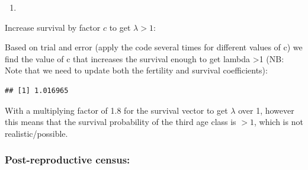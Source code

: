 \documentclass[
]{book}
\newenvironment{Shaded}{\begin{snugshade}}{\end{snugshade}}
\newcommand{\AttributeTok}[1]{\textcolor[rgb]{0.77,0.63,0.00}{#1}}
\newcommand{\CommentTok}[1]{\textcolor[rgb]{0.56,0.35,0.01}{\textit{#1}}}
\newcommand{\DecValTok}[1]{\textcolor[rgb]{0.00,0.00,0.81}{#1}}
\newcommand{\FloatTok}[1]{\textcolor[rgb]{0.00,0.00,0.81}{#1}}
\newcommand{\FunctionTok}[1]{\textcolor[rgb]{0.00,0.00,0.00}{#1}}
\newcommand{\NormalTok}[1]{#1}
\newcommand{\OtherTok}[1]{\textcolor[rgb]{0.56,0.35,0.01}{#1}}
\newcommand{\SpecialCharTok}[1]{\textcolor[rgb]{0.00,0.00,0.00}{#1}}
\providecommand{\tightlist}{%
  \setlength{\itemsep}{0pt}\setlength{\parskip}{0pt}}
\begin{document}
\begin{enumerate}
\def\labelenumi{\arabic{enumi}.}
\setcounter{enumi}{7}
\tightlist
\item
\end{enumerate}

Increase survival by factor \(c\) to get \(\lambda>1\):

Based on trial and error (apply the code several times for different values of c) we find the value of c that increases the survival enough to get lambda \textgreater1 (NB: Note that we need to update both the fertility and survival coefficients):

\begin{Shaded}
\end{Shaded}

\begin{verbatim}
## [1] 1.016965
\end{verbatim}

With a multiplying factor of 1.8 for the survival vector to get \(\lambda\) over 1, however this means that the survival probability of the third age class is \(>1\), which is not realistic/possible.

\hypertarget{post-reproductive-census-1}{%
\subsubsection*{Post-reproductive census:}\label{post-reproductive-census-1}}
\end{document}
